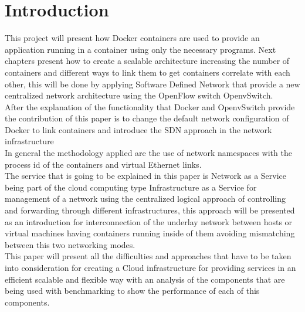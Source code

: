 

\chapter{Introduction} %

\label{ch:introduction} %

 
This project will present how Docker containers are used to provide an application running in a container using only the necessary programs. Next chapters present how to create a scalable architecture increasing the number of containers and different ways to link them to get containers correlate with each other, this will be done by applying Software Defined Network that provide a new centralized network architecture using the OpenFlow switch OpenvSwitch.\\

After the explanation of the functionality that Docker and OpenvSwitch provide the contribution of this paper is to change the default network configuration of Docker to link containers and introduce the SDN approach in the network infrastructure\\
 
In general the methodology applied are the use of network namespaces with the process id of the containers and virtual Ethernet links. \\
 
The service that is going to be explained in this paper is Network as a Service being part of the cloud computing type Infrastructure as a Service for management of a network using the centralized logical approach of controlling and forwarding through different infrastructures, this approach will be presented as an introduction for interconnection of the underlay network between hosts or virtual machines having containers running inside of them avoiding mismatching between this two networking modes. \\
 
This paper will present all the difficulties and approaches that have to be taken into consideration for creating a Cloud infrastructure for providing services in an efficient scalable and flexible way with an analysis of the components that are being used with benchmarking to show the performance of each of this components.\\

